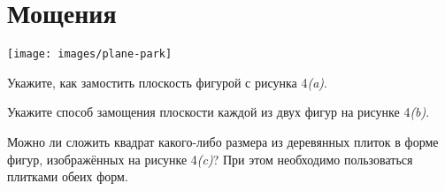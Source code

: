 \section{Мощения}
\vspace{-0.7cm}
\centerline{\texttt{[image: images/plane-park]}}

\begin{enumerate}
\itA Укажите, как замостить плоскость фигурой с рисунка 4{\it (a)}.

\itB Укажите способ замощения плоскости каждой из двух фигур на рисунке 4{\it (b)}.

\itC Можно ли сложить квадрат какого-либо размера из деревянных плиток в форме фигур, изображённых на рисунке 4{\it (c)}? При этом необходимо пользоваться плитками обеих форм.
\end{enumerate}
